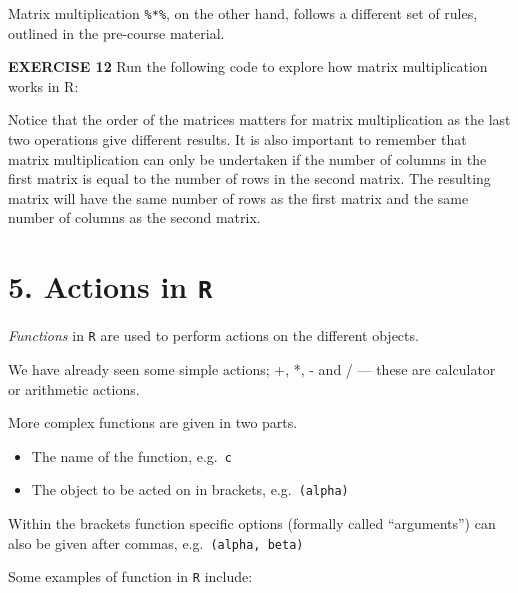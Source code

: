 \documentclass[
]{article}
\newenvironment{Shaded}{\begin{snugshade}}{\end{snugshade}}
\newcommand{\CommentTok}[1]{\textcolor[rgb]{0.56,0.35,0.01}{\textit{#1}}}
\newcommand{\NormalTok}[1]{#1}
\newcommand{\OperatorTok}[1]{\textcolor[rgb]{0.81,0.36,0.00}{\textbf{#1}}}
\newcommand{\StringTok}[1]{\textcolor[rgb]{0.31,0.60,0.02}{#1}}
\begin{document}
Matrix multiplication \texttt{\%*\%}, on the other hand, follows a
different set of rules, outlined in the pre-course material.

\textbf{EXERCISE 12} Run the following code to explore how matrix
multiplication works in R:

\begin{Shaded}
\end{Shaded}

Notice that the order of the matrices matters for matrix multiplication
as the last two operations give different results. It is also important
to remember that matrix multiplication can only be undertaken if the
number of columns in the first matrix is equal to the number of rows in
the second matrix. The resulting matrix will have the same number of
rows as the first matrix and the same number of columns as the second
matrix.

\hypertarget{actions-in-r}{%
\section{\texorpdfstring{5. Actions in
\texttt{R}}{5. Actions in R}}\label{actions-in-r}}

\emph{Functions} in \texttt{R} are used to perform actions on the
different objects.

We have already seen some simple actions; +, *, - and / --- these are
calculator or arithmetic actions.

More complex functions are given in two parts.

\begin{itemize}
\item
  The name of the function, e.g.~\texttt{c}
\item
  The object to be acted on in brackets, e.g.~\texttt{(alpha)}
\end{itemize}

Within the brackets function specific options (formally called
``arguments'') can also be given after commas,
e.g.~\texttt{(alpha,\ beta)}

Some examples of function in \texttt{R} include:
\end{document}
